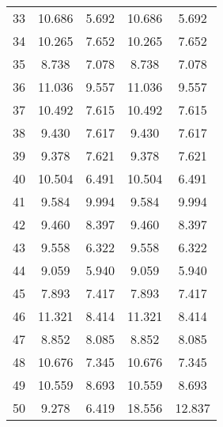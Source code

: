 \begin{longtable}{lcccc}
33&10.686&5.692&10.686&5.692\\
34&10.265&7.652&10.265&7.652\\
35&8.738&7.078&8.738&7.078\\
36&11.036&9.557&11.036&9.557\\
37&10.492&7.615&10.492&7.615\\
38&9.430&7.617&9.430&7.617\\
39&9.378&7.621&9.378&7.621\\
40&10.504&6.491&10.504&6.491\\
41&9.584&9.994&9.584&9.994\\
42&9.460&8.397&9.460&8.397\\
43&9.558&6.322&9.558&6.322\\
44&9.059&5.940&9.059&5.940\\
45&7.893&7.417&7.893&7.417\\
46&11.321&8.414&11.321&8.414\\
47&8.852&8.085&8.852&8.085\\
48&10.676&7.345&10.676&7.345\\
49&10.559&8.693&10.559&8.693\\
50&9.278&6.419&18.556&12.837\\
\hline
\end{longtable}

